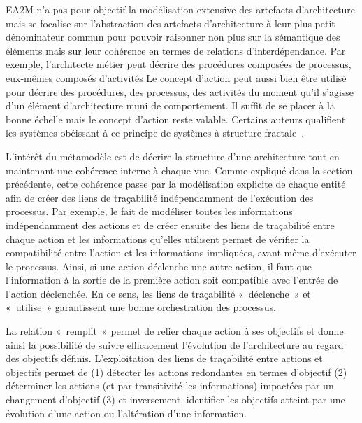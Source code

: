     EA2M n'a pas pour objectif la modélisation extensive des artefacts d'architecture mais se focalise sur
    l'abstraction des artefacts d'architecture à leur plus petit dénominateur commun pour pouvoir raisonner non plus
    sur la sémantique des éléments mais sur leur cohérence en termes de relations d'interdépendance. Par exemple, l'architecte métier 
    peut décrire des procédures composées de processus, eux-mêmes composés d'activités Le concept d'action peut aussi bien
    être utilisé pour décrire des procédures, des processus, des activités du moment qu'il s'agisse d'un élément d'architecture muni
    de comportement. Il suffit de se placer à la bonne échelle mais le concept d'action reste valable. Certains auteurs
    qualifient les systèmes obéissant à ce principe de systèmes à structure fractale~\cite{arsanjani2004service}.

    L'intérêt du métamodèle est de décrire la structure d'une architecture tout en maintenant une cohérence interne
    à chaque vue. Comme expliqué dans la section précédente, cette cohérence passe par la modélisation explicite
    de chaque entité afin de créer des liens de traçabilité indépendamment de l’exécution des processus.
    Par exemple, le fait de modéliser toutes les informations indépendamment des actions et de créer ensuite 
    des liens de traçabilité entre chaque action et les informations qu'elles utilisent permet de vérifier la compatibilité
    entre l'action et les informations impliquées, avant même d'exécuter le processus. Ainsi, si une action déclenche une autre
    action, il faut que l'information à la sortie de la première action soit compatible avec l'entrée de l'action déclenchée.
    En ce sens, les liens de traçabilité «~déclenche~» et «~utilise~»  garantissent
    une bonne orchestration des processus.

    La relation «~remplit~» permet de relier chaque action à ses objectifs et donne ainsi la possibilité 
    de suivre efficacement l’évolution
    de l'architecture au regard des objectifs définis. L'exploitation des liens de traçabilité entre actions et objectifs
    permet de (1) détecter les actions redondantes en termes d'objectif (2) déterminer les actions (et par transitivité 
    les informations) impactées par un changement d'objectif (3) et inversement, identifier les objectifs atteint
    par une évolution d'une action ou l'altération d'une information.

